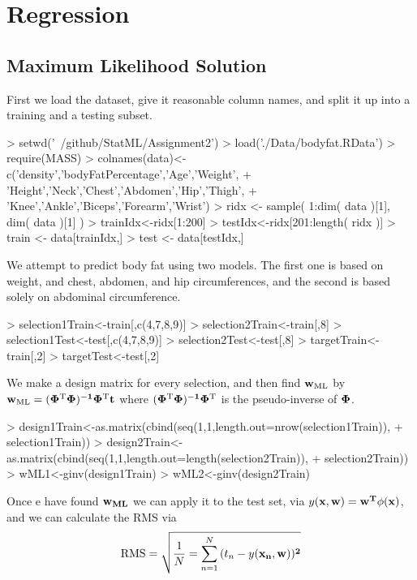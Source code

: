 \documentclass[nogin, 10pt]{article}
\begin{document}
\section{Regression}
\subsection{Maximum Likelihood Solution}
First we load the dataset, give it reasonable column names, and split it up into a training and a testing subset.
\begin{Schunk}
\begin{Sinput}
> setwd('~/github/StatML/Assignment2')
> load('./Data/bodyfat.RData')
> require(MASS)
> colnames(data)<-c('density','bodyFatPercentage','Age','Weight',
+                   'Height','Neck','Chest','Abdomen','Hip','Thigh',
+                   'Knee','Ankle','Biceps','Forearm','Wrist')
> ridx <- sample( 1:dim( data )[1], dim( data )[1] )
> trainIdx<-ridx[1:200]
> testIdx<-ridx[201:length( ridx )]
> train <- data[trainIdx,]
> test <- data[testIdx,]
\end{Sinput}
\end{Schunk}
We attempt to predict body fat using two models. The first one is based on weight, and chest, abdomen, and hip circumferences, and the second is based solely on abdominal circumference.
\begin{Schunk}
\begin{Sinput}
> selection1Train<-train[,c(4,7,8,9)]
> selection2Train<-train[,8]
> selection1Test<-test[,c(4,7,8,9)]
> selection2Test<-test[,8]
> targetTrain<-train[,2]
> targetTest<-test[,2]
\end{Sinput}
\end{Schunk}
We make a design matrix for every selection, and then find $\bf{w}_{\text{ML}}$ by $\bf{w}_{\text{ML}}=(\bf{\Phi}^{\text{T}}\bf{\Phi})^{-1}\bf{\Phi}^{\text{T}}\bf{t}$ where $(\bf{\Phi}^{\text{T}}\bf{\Phi})^{-1}\bf{\Phi}^{\text{T}}$ is the pseudo-inverse of $\bf{\Phi}$.
\begin{Schunk}
\begin{Sinput}
> design1Train<-as.matrix(cbind(seq(1,1,length.out=nrow(selection1Train)),
+                          selection1Train))
> design2Train<-as.matrix(cbind(seq(1,1,length.out=length(selection2Train)),
+                          selection2Train))
> wML1<-ginv(design1Train)%*%targetTrain
> wML2<-ginv(design2Train)%*%targetTrain
\end{Sinput}
\end{Schunk}
Once e have found $\bf{w}_{ML}$ we can apply it to the test set, via $y(\bf{x},\bf{w})=\bf{w}^{\bf{T}}\phi(\bf{x})$, and we can calculate the RMS via \[
\text{RMS}=\sqrt{\frac{1}{N}=\sum^N_{n=1}{(t_n-y(\bf{x}_n,\bf{w}))^2}}
\]
\end{document}
